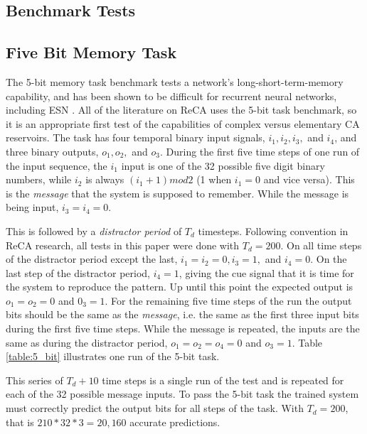 \documentclass{facconf}
\begin{document}
\begin{multicols}{2}
\section{Benchmark Tests}\label{Benchmarks}
\subsection{Five Bit Memory Task}\label{5_bit}
The 5-bit memory task benchmark tests a network's long-short-term-memory 
capability, and has been shown to be difficult for recurrent neural networks, 
    including ESN \cite{hochreiter1997long}\cite{jaeger2012long}. All of the 
    literature on ReCA uses the 5-bit task benchmark, so it is an appropriate 
    first test of the capabilities of complex versus elementary CA reservoirs.  
    The task has four temporal binary input signals, $i_1, i_2, i_3,$ and 
    $i_4$, and three binary outputs, $o_1, o_2,$ and $o_3$.  During the
first five time steps of one run of the input sequence, the $i_1$ input is one 
of the 32 possible five digit binary numbers, while $i_2$ is always $(i_1 + 1) 
    mod 2$ (1 when $i_1 = 0$ and vice versa). This is the \textit{message} that 
    the system is supposed to remember. While the message is being input, $i_3 
    = i_4 = 0$.  \par  This is followed by a \textit{distractor period} of 
    $T_d$ timesteps.  Following convention in ReCA research, all tests in this 
    paper were done with $T_d = 200$.  On all time steps of the distractor 
    period except the last, $i_1 = i_2 = 0, i_3 = 1, $ and $i_4 = 0$. On the 
    last step of the distractor period, $i_4 = 1$, giving the cue signal that 
    it is time for the system to reproduce the pattern. Up until this point the 
    expected output is $o_1 = o_2 = 0 $ and $0_3 = 1$. For the remaining five 
    time steps of the run the output bits should be the same as the 
    \textit{message}, i.e.  the same as the first three input bits during the 
    first five time steps.  While the message is repeated, the inputs are the 
    same as during the distractor period, $o_1 = o_2 = o_4 = 0$ and $o_3 = 1$.  
    Table \ref{table:5_bit} illustrates one run of the 5-bit task. \par
    This series of $T_d + 10$ time steps is a single run of the test and is 
    repeated for each of the 32 possible message inputs. To pass the 5-bit task 
    the trained system must correctly predict the output bits for all steps of 
    the task. With $T_d = 200$, that is $210 * 32 * 3 = 20,160$ accurate 
    predictions.


\end{multicols}
\end{document}
